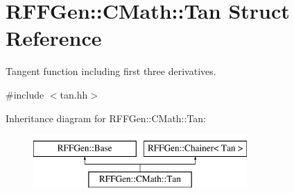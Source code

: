 \hypertarget{structRFFGen_1_1CMath_1_1Tan}{\section{R\-F\-F\-Gen\-:\-:C\-Math\-:\-:Tan Struct Reference}
\label{structRFFGen_1_1CMath_1_1Tan}
}


Tangent function including first three derivatives.  




{\ttfamily \#include $<$tan.\-hh$>$}

Inheritance diagram for R\-F\-F\-Gen\-:\-:C\-Math\-:\-:Tan\-:\begin{figure}[H]
\begin{center}
\leavevmode
\includegraphics[height=2.000000cm]{structRFFGen_1_1CMath_1_1Tan}
\end{center}
\end{figure}
